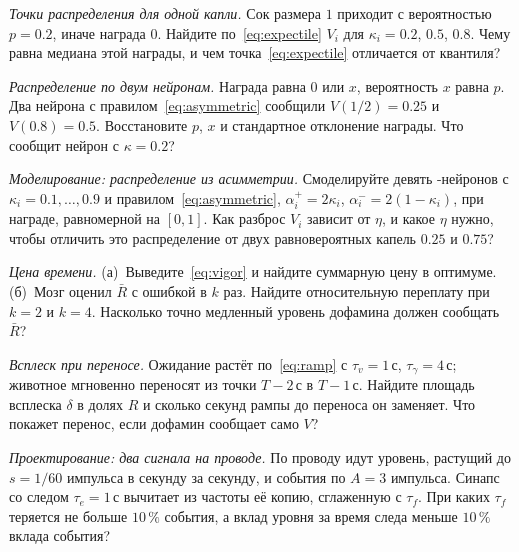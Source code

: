 \begin{exercise}[\lvlA]
\label{ex:07:1}
\emph{Точки распределения для одной капли.} Сок размера $1$ приходит с вероятностью $p=0.2$, иначе награда $0$. Найдите по~\eqref{eq:expectile} $V_i$ для $\kappa_i=0.2$, $0.5$, $0.8$. Чему равна медиана этой награды, и чем точка~\eqref{eq:expectile} отличается от квантиля?
\end{exercise}

\begin{exercise}[\lvlB]
\label{ex:07:2}
\emph{Распределение по двум нейронам.} Награда равна $0$ или $x$, вероятность $x$ равна $p$. Два нейрона с правилом~\eqref{eq:asymmetric} сообщили $V(1/2)=0.25$ и $V(0.8)=0.5$. Восстановите $p$, $x$ и стандартное отклонение награды. Что сообщит нейрон с $\kappa=0.2$?
\end{exercise}

\begin{exercise}[\lvlB]
\label{ex:07:3}
\emph{Моделирование: распределение из асимметрии.} Смоделируйте девять -нейронов с $\kappa_i=0.1,\dots,0.9$ и правилом~\eqref{eq:asymmetric}, $\alpha_i^+=2\kappa_i$, $\alpha_i^-=2(1-\kappa_i)$, при награде, равномерной на $[0,1]$. Как разброс $V_i$ зависит от $\eta$, и какое $\eta$ нужно, чтобы отличить это распределение от двух равновероятных капель $0.25$ и $0.75$?
\end{exercise}

\begin{exercise}[\lvlA]
\label{ex:07:4}
\emph{Цена времени.} (а)~Выведите~\eqref{eq:vigor} и найдите суммарную цену в оптимуме. (б)~Мозг оценил $\bar R$ с ошибкой в $k$ раз. Найдите относительную переплату при $k=2$ и $k=4$. Насколько точно медленный уровень дофамина должен сообщать $\bar R$?
\end{exercise}

\begin{exercise}[\lvlB]
\label{ex:07:5}
\emph{Всплеск при переносе.} Ожидание растёт по~\eqref{eq:ramp} с $\tau_v=1\,\text{с}$, $\tau_\gamma=4\,\text{с}$; животное мгновенно переносят из точки $T-2\,\text{с}$ в $T-1\,\text{с}$. Найдите площадь всплеска $\delta$ в долях $R$ и сколько секунд рампы до переноса он заменяет. Что покажет перенос, если дофамин сообщает само $V$?
\end{exercise}

\begin{exercise}[\lvlB]
\label{ex:07:6}
\emph{Проектирование: два сигнала на проводе.} По проводу  идут уровень, растущий до $s=1/60$ импульса в секунду за секунду, и события по $A=3$ импульса. Синапс со следом $\tau_e=1\,\text{с}$ вычитает из частоты её копию, сглаженную с $\tau_f$. При каких $\tau_f$ теряется не больше $10\,\%$ события, а вклад уровня за время следа меньше $10\,\%$ вклада события?
\end{exercise}

